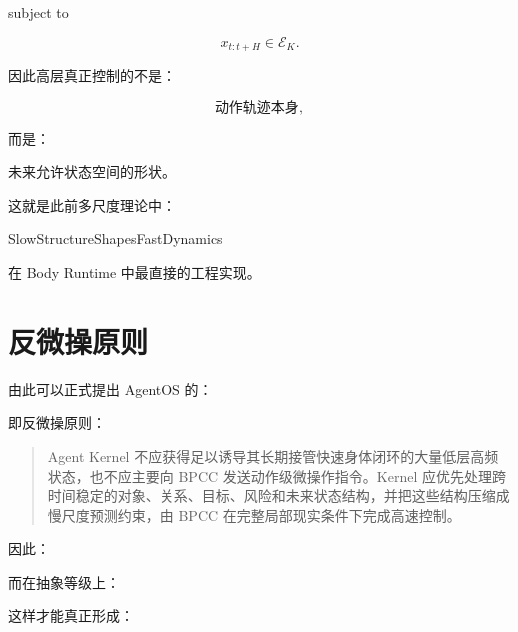 subject to

\[
x_{t:t+H}
\in
\mathcal E_K.
\]

因此高层真正控制的不是：

\[
\text{动作轨迹本身},
\]

而是：

\begin{statementbox}
未来允许状态空间的形状。
\end{statementbox}

这就是此前多尺度理论中：

\begin{statementbox}
SlowStructureShapesFastDynamics
\end{statementbox}

在 Body Runtime 中最直接的工程实现。

\section{反微操原则}

由此可以正式提出 AgentOS 的：

\begin{statementbox}
\centering
{}
\end{statementbox}

即反微操原则：

\begin{quote}
Agent Kernel 不应获得足以诱导其长期接管快速身体闭环的大量低层高频状态，也不应主要向 BPCC 发送动作级微操作指令。Kernel 应优先处理跨时间稳定的对象、关系、目标、风险和未来状态结构，并把这些结构压缩成慢尺度预测约束，由 BPCC 在完整局部现实条件下完成高速控制。
\end{quote}

因此：

\begin{statementbox}
\centering
{}
\end{statementbox}

而在抽象等级上：

\begin{statementbox}
\centering
{}
\end{statementbox}

这样才能真正形成：

\begin{statementbox}
\centering
{}
\end{statementbox}

